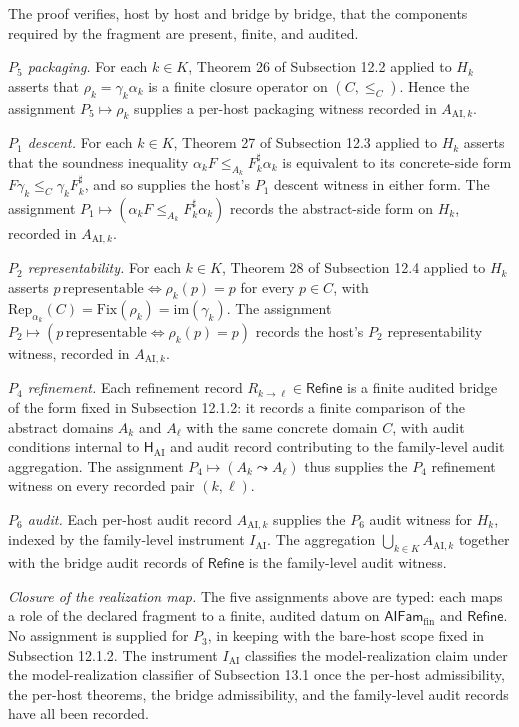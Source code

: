 \documentclass[11pt]{article}
\theoremstyle{definition}
\begin{document}
The proof verifies, host by host and bridge by bridge, that the components required by the fragment are present, finite, and audited.

\emph{\(P_5\) packaging.} For each \(k\in K\), Theorem 26 of Subsection 12.2 applied to \(H_k\) asserts that \(\rho_k=\gamma_k\alpha_k\) is a finite closure operator on \((C,\le_C)\). Hence the assignment \(P_5\mapsto\rho_k\) supplies a per-host packaging witness recorded in \(A_{\mathrm{AI},k}\).

\emph{\(P_1\) descent.} For each \(k\in K\), Theorem 27 of Subsection 12.3 applied to \(H_k\) asserts that the soundness inequality \(\alpha_k F\le_{A_k}F_k^{\sharp}\alpha_k\) is equivalent to its concrete-side form \(F\gamma_k\le_C\gamma_k F_k^{\sharp}\), and so supplies the host's \(P_1\) descent witness in either form. The assignment \(P_1\mapsto(\alpha_k F\le_{A_k}F_k^{\sharp}\alpha_k)\) records the abstract-side form on \(H_k\), recorded in \(A_{\mathrm{AI},k}\).

\emph{\(P_2\) representability.} For each \(k\in K\), Theorem 28 of Subsection 12.4 applied to \(H_k\) asserts \(p\,\text{representable}\iff\rho_k(p)=p\) for every \(p\in C\), with \(\mathrm{Rep}_{\alpha_k}(C)=\mathrm{Fix}(\rho_k)=\mathrm{im}(\gamma_k)\). The assignment \(P_2\mapsto(p\,\text{representable}\iff\rho_k(p)=p)\) records the host's \(P_2\) representability witness, recorded in \(A_{\mathrm{AI},k}\).

\emph{\(P_4\) refinement.} Each refinement record \(R_{k\to\ell}\in\mathsf{Refine}\) is a finite audited bridge of the form fixed in Subsection 12.1.2: it records a finite comparison of the abstract domains \(A_k\) and \(A_\ell\) with the same concrete domain \(C\), with audit conditions internal to \(\mathsf H_{\mathrm{AI}}\) and audit record contributing to the family-level audit aggregation. The assignment \(P_4\mapsto(A_k\leadsto A_\ell)\) thus supplies the \(P_4\) refinement witness on every recorded pair \((k,\ell)\).

\emph{\(P_6\) audit.} Each per-host audit record \(A_{\mathrm{AI},k}\) supplies the \(P_6\) audit witness for \(H_k\), indexed by the family-level instrument \(I_{\mathrm{AI}}\). The aggregation \(\bigcup_{k\in K}A_{\mathrm{AI},k}\) together with the bridge audit records of \(\mathsf{Refine}\) is the family-level audit witness.

\emph{Closure of the realization map.} The five assignments above are typed: each maps a role of the declared fragment to a finite, audited datum on \(\mathsf{AIFam}_{\mathrm{fin}}\) and \(\mathsf{Refine}\). No assignment is supplied for \(P_3\), in keeping with the bare-host scope fixed in Subsection 12.1.2. The instrument \(I_{\mathrm{AI}}\) classifies the model-realization claim under the model-realization classifier of Subsection 13.1 once the per-host admissibility, the per-host theorems, the bridge admissibility, and the family-level audit records have all been recorded.
\end{document}
